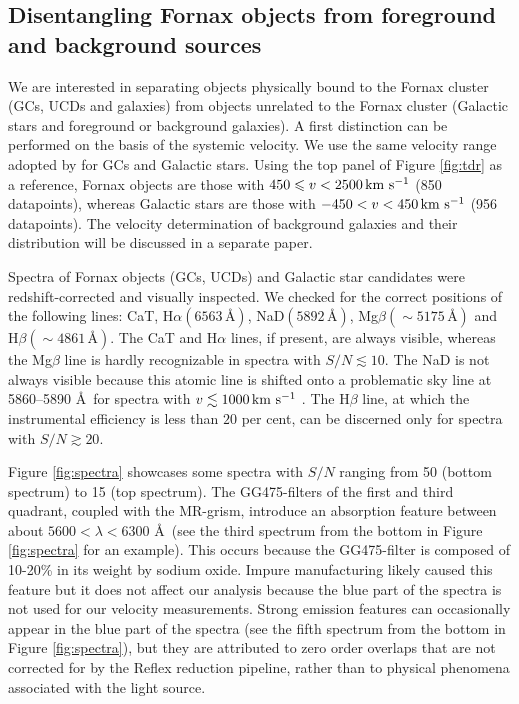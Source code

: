 \documentclass[useAMS,usenatbib]{mn2e}
\newcommand{\kms}{\mbox{\,km~s$^{-1}$}}
\begin{document}
\subsection{Disentangling Fornax objects from foreground and background 
sources}

We are interested in separating objects physically bound to the Fornax cluster 
(GCs, UCDs and galaxies) from objects unrelated to the Fornax cluster (Galactic 
stars and foreground or background galaxies). A first distinction can be 
performed on the basis of the systemic velocity. We use the same velocity range 
adopted by \cite{Schuberth} for GCs and Galactic stars.
Using the top panel of Figure \ref{fig:tdr} as a reference, Fornax objects are 
those with $450 \le v <2500 \kms$ (850 datapoints), whereas Galactic stars are 
those with $-450<v<450 \kms$ (956 datapoints). The velocity determination of 
background galaxies and their distribution will be discussed in a separate 
paper.

Spectra of Fornax objects (GCs, UCDs) and Galactic star candidates were 
redshift-corrected and visually inspected. We checked for the correct positions of the 
following lines: CaT, H$\alpha (6563 \, \mbox{\AA})$, NaD$(5892 \, 
\mbox{\AA})$, Mg$\beta (\sim 5175 \, \mbox{\AA})$ and H$\beta (\sim 4861\, 
\mbox{\AA})$. The CaT and H$\alpha$ lines, if present, are always visible, 
whereas the Mg$\beta$ line is hardly recognizable in spectra with $S/N \lesssim 
10$. The NaD is not always visible because this atomic line is shifted onto a 
problematic sky line at 5860--5890 \AA\ for spectra with $v \lesssim 1000\kms$ . 
The H$\beta$ line, at which the instrumental efficiency is less than $20$ per 
cent, can be discerned only for spectra with $S/N \gtrsim 20 $.

Figure \ref{fig:spectra} showcases some spectra with $S/N$ ranging from 50 
(bottom spectrum) to 15 (top spectrum). 
The GG475-filters of the first and third quadrant, coupled with the MR-grism, 
introduce an absorption feature between about $5600 < \lambda < 6300$ \AA\ 
(see the third spectrum from the bottom in Figure \ref{fig:spectra} for an 
example). This occurs because the GG475-filter is composed of 10-20\% in its 
weight by sodium oxide. Impure manufacturing likely caused this feature but it 
does not affect our analysis because the blue part of the spectra is not used 
for our velocity measurements. Strong emission features can occasionally appear 
in the blue part of the spectra (see the fifth spectrum from the bottom in 
Figure \ref{fig:spectra}), but they are attributed to zero order overlaps that 
are not corrected for by the Reflex reduction pipeline, rather than to physical 
phenomena associated with the light source. 
\end{document}
